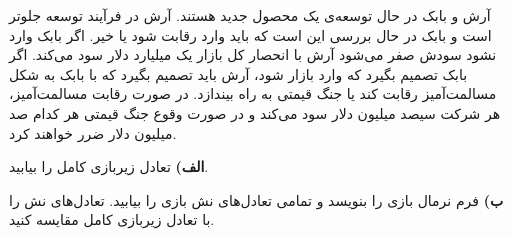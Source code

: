 آرش و بابک در حال توسعه‌ی یک محصول جدید هستند. آرش در فرآیند توسعه جلوتر است و بابک در حال بررسی این است که باید وارد رقابت شود یا خیر. اگر بابک وارد نشود سودش صفر می‌شود آرش با انحصار کل بازار یک میلیارد دلار سود می‌کند. اگر بابک تصمیم بگیرد که وارد بازار شود، آرش باید تصمیم بگیرد که با بابک به شکل مسالمت‌آمیز رقابت کند یا جنگ قیمتی به راه بیندازد. در صورت رقابت مسالمت‌آمیز، هر شرکت سیصد میلیون دلار سود می‌کند و در صورت وقوع جنگ قیمتی هر کدام صد میلیون دلار ضرر خواهند کرد.
\vspace{10pt}

\textbf{الف)}
تعادل زیربازی کامل را بیابید.
\vspace{5pt}

\textbf{ب)}
فرم نرمال بازی را بنویسد و تمامی تعادل‌های نش بازی را بیابید. تعادل‌های نش را با تعادل زیربازی کامل مقایسه کنید.